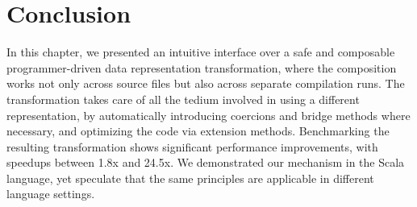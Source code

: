 \section{Conclusion}
\label{ildl:sec:concls}


In this chapter, we presented an intuitive interface over a safe and
composable programmer-driven data representation transformation, where
the composition works not only across source files but also across
separate compilation runs.
The transformation takes care of all the tedium involved in using a
different representation, by automatically introducing coercions and
bridge methods where necessary, and optimizing the code via extension
methods. Benchmarking the resulting transformation shows significant
performance improvements, with speedups between 1.8x and 24.5x. We
demonstrated our mechanism in the Scala language, yet speculate that
the same principles are applicable in different language settings.
